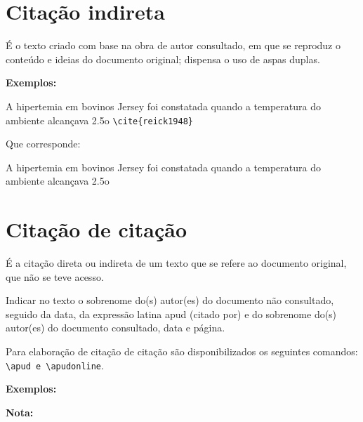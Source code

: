 \section{Cita\c{c}\~ao indireta}

\'E o texto criado com base na obra de autor consultado, em que se reproduz o conte\'udo e ideias do documento original; dispensa o uso de aspas duplas.

\textbf{Exemplos:}

A hipertemia em bovinos Jersey foi constatada quando a temperatura do ambiente
alcan\c{c}ava 2.5o \verb+\cite{reick1948}+

Que corresponde:

A hipertemia em bovinos Jersey foi constatada quando a temperatura do ambiente
alcan\c{c}ava 2.5o \cite{reick1948}


\section{Cita\c{c}\~ao de cita\c{c}\~ao}

\'E a cita\c{c}\~ao direta ou indireta de um texto que se refere ao documento original, que n\~ao se teve acesso.

Indicar no texto o sobrenome do(s) autor(es) do documento n\~ao consultado, seguido da data, da express\~ao latina apud (citado por) e do sobrenome do(s) autor(es) do documento consultado, data e p\'agina. 

Para elabora\c{c}\~ao de cita\c{c}\~ao de cita\c{c}\~ao s\~ao disponibilizados os seguintes comandos: \verb+\apud e \apudonline+.

\textbf{Exemplos:}

\textbf{Nota:}


